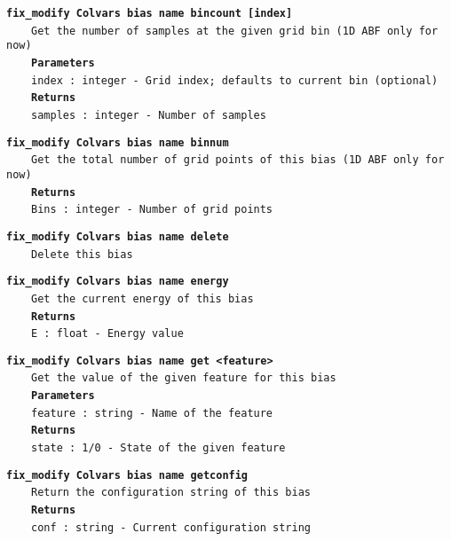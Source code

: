 \begin{mdexampleinput}{}
\texttt{\textbf{fix\_modify Colvars bias name bincount [index]}}
\\
\-~~~~\texttt{Get the number of samples at the given grid bin (1D ABF only for now)}
\\
\-~~~~\texttt{\textbf{Parameters}}
\\
\-~~~~\texttt{index : integer - Grid index; defaults to current bin (optional)}
\\
\-~~~~\texttt{\textbf{Returns}}
\\
\-~~~~\texttt{samples : integer - Number of samples}
\end{mdexampleinput}
\begin{mdexampleinput}{}
\texttt{\textbf{fix\_modify Colvars bias name binnum}}
\\
\-~~~~\texttt{Get the total number of grid points of this bias (1D ABF only for now)}
\\
\-~~~~\texttt{\textbf{Returns}}
\\
\-~~~~\texttt{Bins : integer - Number of grid points}
\end{mdexampleinput}
\begin{mdexampleinput}{}
\texttt{\textbf{fix\_modify Colvars bias name delete}}
\\
\-~~~~\texttt{Delete this bias}
\end{mdexampleinput}
\begin{mdexampleinput}{}
\texttt{\textbf{fix\_modify Colvars bias name energy}}
\\
\-~~~~\texttt{Get the current energy of this bias}
\\
\-~~~~\texttt{\textbf{Returns}}
\\
\-~~~~\texttt{E : float - Energy value}
\end{mdexampleinput}
\begin{mdexampleinput}{}
\texttt{\textbf{fix\_modify Colvars bias name get <feature>}}
\\
\-~~~~\texttt{Get the value of the given feature for this bias}
\\
\-~~~~\texttt{\textbf{Parameters}}
\\
\-~~~~\texttt{feature : string - Name of the feature}
\\
\-~~~~\texttt{\textbf{Returns}}
\\
\-~~~~\texttt{state : 1/0 - State of the given feature}
\end{mdexampleinput}
\begin{mdexampleinput}{}
\texttt{\textbf{fix\_modify Colvars bias name getconfig}}
\\
\-~~~~\texttt{Return the configuration string of this bias}
\\
\-~~~~\texttt{\textbf{Returns}}
\\
\-~~~~\texttt{conf : string - Current configuration string}
\end{mdexampleinput}
